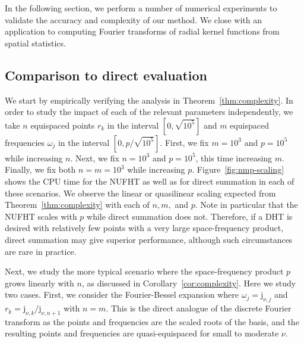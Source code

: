 In the following section, we perform a number of numerical experiments to
validate the accuracy and complexity of our method. We close with an application
to computing Fourier transforms of radial kernel functions from spatial
statistics.

\subsection{Comparison to direct evaluation}

We start by empirically verifying the analysis in Theorem~\ref{thm:complexity}.
In order to study the impact of each of the relevant parameters independently,
we take $n$ equispaced points $r_k$ in the interval $[0,\sqrt{10^5}]$ and $m$
equispaced frequencies $\omega_j$ in the interval $[0,p/\sqrt{10^5}]$. First, we
fix $m=10^3$ and $p=10^5$ while increasing $n$. Next, we fix $n=10^3$ and
$p=10^5$, this time increasing $m$. Finally, we fix both $n = m = 10^3$ while
increasing $p$. Figure~\ref{fig:nmp-scaling} shows the CPU time for the NUFHT as
well as for direct summation in each of these scenarios. We observe the linear
or quasilinear scaling expected from Theorem~\ref{thm:complexity} with each of
$n, m,$ and $p$. Note in particular that the NUFHT scales with $p$ while direct
summation does not. Therefore, if a DHT is desired with relatively few points
with a very large space-frequency product, direct summation may give superior
performance, although such circumstances are rare in practice.

Next, we study the more typical scenario where the space-frequency product $p$
grows linearly with $n$, as discussed in Corollary~\ref{cor:complexity}. Here we
study two cases. First, we consider the Fourier-Bessel expansion where $\omega_j
= \mathrm{j}_{\nu, j}$ and $r_k = \mathrm{j}_{\nu, k}/\mathrm{j}_{\nu, n+1}$
with $n = m$. This is the direct analogue of the discrete Fourier transform as
the points and frequencies are the scaled roots of the basis, and the resulting
points and frequencies are quasi-equispaced for small to moderate $\nu$. 

